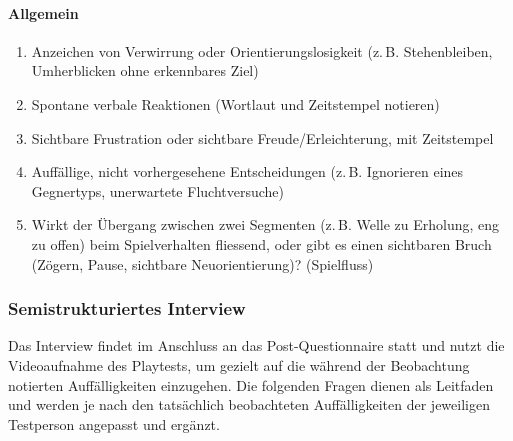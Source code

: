 \documentclass[../Main.tex]{subfiles}
\begin{document}
\paragraph{Allgemein}
\begin{enumerate}[label=\textbf{B\arabic*}, leftmargin=1.5cm, itemsep=0.5em, resume]
    \item Anzeichen von Verwirrung oder Orientierungslosigkeit (z.\,B. Stehenbleiben, Umherblicken ohne erkennbares Ziel)
    \item Spontane verbale Reaktionen (Wortlaut und Zeitstempel notieren)
    \item Sichtbare Frustration oder sichtbare Freude/Erleichterung, mit Zeitstempel
    \item Auffällige, nicht vorhergesehene Entscheidungen (z.\,B. Ignorieren eines Gegnertyps, unerwartete Fluchtversuche)
    \item Wirkt der Übergang zwischen zwei Segmenten (z.\,B. Welle zu Erholung, eng zu offen) beim Spielverhalten fliessend, oder gibt es einen sichtbaren Bruch (Zögern, Pause, sichtbare Neuorientierung)? \hfill (Spielfluss)
\end{enumerate}

\subsubsection{Semistrukturiertes Interview}
 
Das Interview findet im Anschluss an das Post-Questionnaire statt und nutzt die Videoaufnahme des Playtests, um gezielt auf die während der Beobachtung notierten Auffälligkeiten einzugehen. Die folgenden Fragen dienen als Leitfaden und werden je nach den tatsächlich beobachteten Auffälligkeiten der jeweiligen Testperson angepasst und ergänzt.
 
\end{document}
